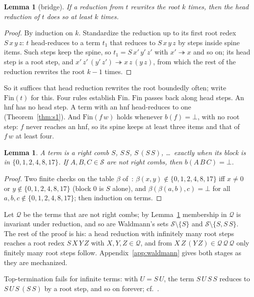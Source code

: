 \documentclass[11pt]{amsart}
\newtheorem{lemma}[theorem]{Lemma}
\theoremstyle{definition}
\theoremstyle{remark}
\newcommand{\Ter}{\mathcal S}
\newcommand{\Q}{\mathcal Q}
\begin{document}
\begin{lemma}[bridge]\label{lem:bridge}
If a reduction from $t$ rewrites the root $k$ times, then the head reduction of $t$ does so at
least $k$ times.
\end{lemma}
\begin{proof}
By induction on $k$. Standardize the reduction up to its first root redex $S\,x\,y\,z$: $t$
head-reduces to a term $t_1$ that reduces to $S\,x\,y\,z$ by steps inside spine items. Such
steps keep the spine, so $t_1=S\,x'\,y'\,z'$ with $x'\twoheadrightarrow x$ and so on; its head
step is a root step, and $x'\,z'\,(y'\,z')\twoheadrightarrow x\,z\,(y\,z)$, from which the
rest of the reduction rewrites the root $k-1$ times.
\end{proof}

So it suffices that head reduction rewrites the root boundedly often; write $\mathrm{Fin}(t)$
for this. Four rules establish $\mathrm{Fin}$. $\mathrm{Fin}$ passes back along head steps. An hnf has no head
step. A term with an hnf head-reduces to one (Theorem~\ref{thm:s1}). And
$\mathrm{Fin}(f\,w)$ holds whenever $b(f)=\bot$, with no root step: $f$ never reaches an
hnf, so its spine keeps at least three items and that of $f\,w$ at least four.

\begin{lemma}\label{lem:qblocks}
A term is a \emph{right comb} $S$, $S\,S$, $S\,(S\,S)$, \dots\ exactly when its block is in
$\{0,1,2,4,8,17\}$. If $A,B,C\in\Ter$ are not right combs, then $b(A\,B\,C)=\bot$.
\end{lemma}
\begin{proof}
Two finite checks on the table $\beta$ of~\citep{s1}: $\beta(x,y)\notin\{0,1,2,4,8,17\}$ iff
$x\ne0$ or $y\notin\{0,1,2,4,8,17\}$ (block $0$ is $S$ alone), and
$\beta(\beta(a,b),c)=\bot$ for all $a,b,c\notin\{0,1,2,4,8,17\}$; then induction on terms.
\end{proof}

Let $\Q$ be the terms that are not right combs; by Lemma~\ref{lem:qblocks} membership in $\Q$
is invariant under reduction, and so are Waldmann's sets $\Ter\setminus\{S\}$ and $\Ter\setminus\{S,S\,S\}$. The rest
of the proof is his: a head reduction with infinitely many root steps reaches a root redex
$S\,X\,Y\,Z$ with $X,Y,Z\in\Q$, and from $X\,Z\,(Y\,Z)\in\Q\,\Q\,\Q$ only finitely many root
steps follow. Appendix~\ref{app:waldmann} gives both stages as they are mechanized.

Top-termination fails for infinite terms: with $U=S\,U$, the term $S\,U\,S\,S$ reduces to
$S\,U\,S\,(S\,S)$ by a root step, and so on forever; cf.~\citep[App.~A.5]{dots}.
\end{document}
